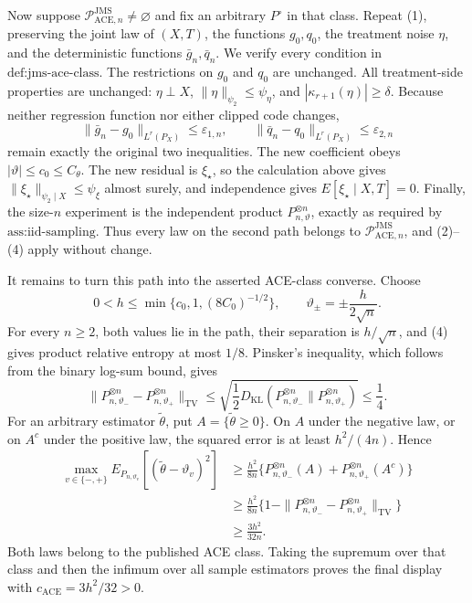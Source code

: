 Now suppose \(\mathcal P_{\mathrm{ACE},n}^{\mathrm{JMS}}\neq\varnothing\) and fix an arbitrary \(P^{\circ}\) in that class. Repeat (1), preserving the joint law of \((X,T)\), the functions \(g_0,q_0\), the treatment noise \(\eta\), and the deterministic functions \(\bar g_n,\bar q_n\). We verify every condition in \(\text{def:jms-ace-class}\). The restrictions on \(g_0\) and \(q_0\) are unchanged. All treatment-side properties are unchanged: \(\eta\perp X\), \(\|\eta\|_{\psi_2}\le\psi_{\eta}\), and \(|\kappa_{r+1}(\eta)|\ge\delta\). Because neither regression function nor either clipped code changes,
\[
 \|\bar g_n-g_0\|_{L^r(P_X)}\le\varepsilon_{1,n},
 \qquad
 \|\bar q_n-q_0\|_{L^r(P_X)}\le\varepsilon_{2,n}
\]
remain exactly the original two inequalities. The new coefficient obeys \(|\vartheta|\le c_0\le C_{\theta}\). The new residual is \(\xi_{\star}\), so the calculation above gives \(\|\xi_{\star}\|_{\psi_2\mid X}\le\psi_{\xi}\) almost surely, and independence gives \(E[\xi_{\star}\mid X,T]=0\). Finally, the size-\(n\) experiment is the independent product \(P_{n,\vartheta}^{\otimes n}\), exactly as required by \(\text{ass:iid-sampling}\). Thus every law on the second path belongs to \(\mathcal P_{\mathrm{ACE},n}^{\mathrm{JMS}}\), and (2)--(4) apply without change.

It remains to turn this path into the asserted ACE-class converse. Choose
\[
 0<h\le\min\{c_0,1,(8C_0)^{-1/2}\},
 \qquad
 \vartheta_{\pm}=\pm\frac{h}{2\sqrt n}.
\]
For every \(n\ge2\), both values lie in the path, their separation is \(h/\sqrt n\), and (4) gives product relative entropy at most \(1/8\). Pinsker's inequality, which follows from the binary log-sum bound, gives
\[
 \|P_{n,\vartheta_-}^{\otimes n}-P_{n,\vartheta_+}^{\otimes n}\|_{\mathrm{TV}}
 \le\sqrt{\frac12D_{\mathrm{KL}}(P_{n,\vartheta_-}^{\otimes n}\|P_{n,\vartheta_+}^{\otimes n})}
 \le\frac14.
 \tag{5}
\]
For an arbitrary estimator \(\widetilde\theta\), put \(A=\{\widetilde\theta\ge0\}\). On \(A\) under the negative law, or on \(A^c\) under the positive law, the squared error is at least \(h^2/(4n)\). Hence
\[
\begin{aligned}
 \max_{v\in\{-,+\}}
 E_{P_{n,\vartheta_v}}[(\widetilde\theta-\vartheta_v)^2]
 &\ge \frac{h^2}{8n}
 \{P_{n,\vartheta_-}^{\otimes n}(A)
   +P_{n,\vartheta_+}^{\otimes n}(A^c)\}\\
 &\ge \frac{h^2}{8n}
 \{1-\|P_{n,\vartheta_-}^{\otimes n}-P_{n,\vartheta_+}^{\otimes n}\|_{\mathrm{TV}}\}\\
 &\ge\frac{3h^2}{32n}.
\end{aligned}
\]
Both laws belong to the published ACE class. Taking the supremum over that class and then the infimum over all sample estimators proves the final display with \(c_{\mathrm{ACE}}=3h^2/32>0\).